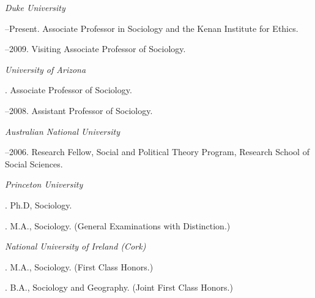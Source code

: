 \documentclass[11pt]{article}
\begin{document}
\medskip

\reversemarginpar

\medskip       

\medskip
{}

\noindent\emph{Duke University \vspace{0.01in}}

--Present. Associate Professor in Sociology and the Kenan Institute for Ethics.      

--2009. Visiting Associate Professor of Sociology.

\medskip
\noindent\emph{University of Arizona \vspace{0.01in}}

. Associate Professor of Sociology.

--2008. Assistant Professor of Sociology.

\medskip

\noindent\emph{Australian National University \vspace{0.01in}}

--2006. Research Fellow, Social and Political Theory Program,
Research School of Social Sciences.

\bigskip



\noindent\emph{Princeton University \vspace{0.01in}}

. Ph.D, Sociology. %



. M.A., Sociology. (General Examinations with Distinction.)


\medskip
\noindent\emph{National University of Ireland (Cork)\vspace{0.02in}}

. M.A., Sociology. (First Class Honors.) \vspace{0.01in}


. B.A., Sociology and Geography. (Joint First Class Honors.) 
\end{document}
